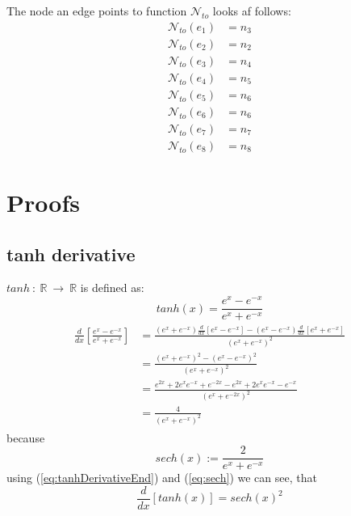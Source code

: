 \documentclass[12pt]{article}
\begin{document}
The node an edge points to function \(\mathcal N_{to}\) looks af follows:
\begin{align}
	\mathcal N_{to} (e_1) &= n_3\\
	\mathcal N_{to} (e_2) &= n_2\\
	\mathcal N_{to} (e_3) &= n_4\\
	\mathcal N_{to} (e_4) &= n_5\\
	\mathcal N_{to} (e_5) &= n_6\\
	\mathcal N_{to} (e_6) &= n_6\\
	\mathcal N_{to} (e_7) &= n_7\\
	\mathcal N_{to} (e_8) &= n_8
\end{align}

\section{Proofs}
\subsection{tanh derivative} \label{sec:proof:tanhd/dx}
\(tanh~:~\mathbb R~\to~\mathbb R\) is defined as:
\begin{equation}
tanh(x) = \frac{e^x-e^{-x}}{e^x+e^{-x}}
\end{equation}
\begin{align}
\begin{split}
\frac{d}{dx}\left[ \frac{e^x-e^{-x}}{e^x+e^{-x}}\right] &= \frac{ 
													(e^x+e^{-x})\frac{d}{dx}\left[e^x-e^{-x}\right]
												- (e^x-e^{-x}) \frac{d}{dx}\left[e^x+e^{-x}\right]}
											{(e^x+e^{-x})^2}\\
&= \frac{(e^x+e^{-x})^2 - (e^x-e^{-x})^2}{(e^x+e^{-x})^2}\\
&= \frac{e^{2x} + 2e^xe^{-x} + e^{-2x} - e^{2x} + 2e^xe^{-x} -e^{-x}}{(e^x+e^{-2x})^2}\\
&= \frac{4}{(e^x+e^{-x})^2}
\end{split}
\label{eq:tanhDerivativeEnd}
\end{align}
because
\begin{equation}\label{eq:sech}
sech(x) := \frac{2}{e^x+e^{-x}}
\end{equation}
using (\ref{eq:tanhDerivativeEnd}) and (\ref{eq:sech}) we can see, that
\begin{equation}
\frac{d}{dx}\left[tanh(x)\right] = sech(x)^2
\end{equation}
\end{document}
